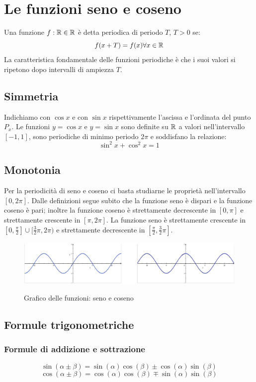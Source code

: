 \section{Le funzioni seno e coseno}
Una funzione $f:\mathbb{R} \in \mathbb{R}$ è detta periodica di periodo $T$, $T>0$ se:
\[f(x+T)=f(x) \forall x \in \mathbb{R}\]
La caratteristica fondamentale delle funzioni periodiche è che i suoi valori si ripetono dopo intervalli di ampiezza $T$.

\subsection{Simmetria}
Indichiamo con $\cos x$ e con $\sin x$ rispettivamente l'ascissa e l'ordinata del punto $P_x$. Le funzioni $y=\cos x$ e $y=\sin x$ sono definite su $\mathbb{R}$ a valori nell'intervallo $[-1,1]$, sono periodiche di minimo periodo $2\pi$ e soddisfano la relazione:
\[\sin^2 x + \cos^2 x = 1\]

\subsection{Monotonia} Per la periodicità di seno e coseno ci basta studiarne le proprietà nell'intervallo $[0,2\pi]$. Dalle definizioni segue subito che la funzione seno è dispari e la funzione coseno è pari; inoltre la funzione coseno è strettamente decrescente in $[0,\pi]$ e strettamente crescente in $[\pi,2\pi]$. La funzione seno è strettamente crescente in $[0,\frac{\pi}{2}] \cup [\frac{3}{2}\pi,2\pi)$ e strettamente decrescente in $[\frac{\pi}{2},\frac{3}{2}\pi]$.

\begin{figure}[H]
{\includegraphics[width=1\linewidth]{gfx/4/senocoseno.png}}
\caption{Grafico delle funzioni: seno e coseno}\label{fig:seno-coseno}
\end{figure}

\subsection{Formule trigonometriche}
\subsubsection{Formule di addizione e sottrazione}
\[\sin(\alpha\pm\beta)=\sin(\alpha)\cos(\beta)\pm\cos(\alpha)\sin(\beta)\]
\[\cos(\alpha\pm\beta)=\cos(\alpha)\cos(\beta)\mp\sin(\alpha)\sin(\beta)\]
